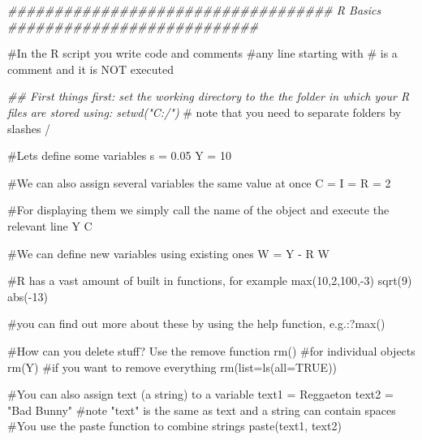 \documentclass[
  letterpaper,
  DIV=11,
  numbers=noendperiod]{scrreprt}
\newenvironment{Shaded}{\begin{snugshade}}{\end{snugshade}}
\newcommand{\AttributeTok}[1]{\textcolor[rgb]{0.40,0.45,0.13}{#1}}
\newcommand{\CommentTok}[1]{\textcolor[rgb]{0.37,0.37,0.37}{#1}}
\newcommand{\ConstantTok}[1]{\textcolor[rgb]{0.56,0.35,0.01}{#1}}
\newcommand{\DecValTok}[1]{\textcolor[rgb]{0.68,0.00,0.00}{#1}}
\newcommand{\DocumentationTok}[1]{\textcolor[rgb]{0.37,0.37,0.37}{\textit{#1}}}
\newcommand{\FloatTok}[1]{\textcolor[rgb]{0.68,0.00,0.00}{#1}}
\newcommand{\FunctionTok}[1]{\textcolor[rgb]{0.28,0.35,0.67}{#1}}
\newcommand{\NormalTok}[1]{\textcolor[rgb]{0.00,0.23,0.31}{#1}}
\newcommand{\OtherTok}[1]{\textcolor[rgb]{0.00,0.23,0.31}{#1}}
\newcommand{\SpecialCharTok}[1]{\textcolor[rgb]{0.37,0.37,0.37}{#1}}
\newcommand{\StringTok}[1]{\textcolor[rgb]{0.13,0.47,0.30}{#1}}
\begin{document}
\begin{Shaded}
\begin{Highlighting}[]
\DocumentationTok{\#\#\#\#\#\#\#\#\#\#\#\#\#\#\#\#\#\#\#\#\#\#\#\#\#\#\#\#\#\#\#\#\#\#\# R Basics \#\#\#\#\#\#\#\#\#\#\#\#\#\#\#\#\#\#\#\#\#\#\#\#\#\#\#}

\CommentTok{\#In the R script you write code and comments}
  \CommentTok{\#any line starting with \# is a comment and it is NOT executed}

\DocumentationTok{\#\# First things first: set the working directory to the the folder in which your R files are stored using: setwd("C:/")}
\CommentTok{\# note that you need to separate folders by slashes /}

\CommentTok{\#Let\textquotesingle{}s define some variables}
\NormalTok{s }\OtherTok{=} \FloatTok{0.05}
\NormalTok{Y }\OtherTok{=} \DecValTok{10}

\CommentTok{\#We can also assign several variables the same value at once}
\NormalTok{C }\OtherTok{=}\NormalTok{ I }\OtherTok{=}\NormalTok{ R }\OtherTok{=} \DecValTok{2}

\CommentTok{\#For displaying them we simply call the name of the object and execute the relevant line}
\NormalTok{Y}
\NormalTok{C}

\CommentTok{\#We can define new variables using existing ones}
\NormalTok{W }\OtherTok{=}\NormalTok{ Y }\SpecialCharTok{{-}}\NormalTok{ R}
\NormalTok{W}

\CommentTok{\#R has a vast amount of built in functions, for example}
\FunctionTok{max}\NormalTok{(}\DecValTok{10}\NormalTok{,}\DecValTok{2}\NormalTok{,}\DecValTok{100}\NormalTok{,}\SpecialCharTok{{-}}\DecValTok{3}\NormalTok{)}
\FunctionTok{sqrt}\NormalTok{(}\DecValTok{9}\NormalTok{)}
\FunctionTok{abs}\NormalTok{(}\SpecialCharTok{{-}}\DecValTok{13}\NormalTok{)}

\CommentTok{\#you can find out more about these by using the help function, e.g.:?max()}

\CommentTok{\#How can you delete stuff? Use the remove function rm()}
\CommentTok{\#for individual objects}
\FunctionTok{rm}\NormalTok{(Y)}
\CommentTok{\#if you want to remove everything}
\FunctionTok{rm}\NormalTok{(}\AttributeTok{list=}\FunctionTok{ls}\NormalTok{(}\AttributeTok{all=}\ConstantTok{TRUE}\NormalTok{))}

\CommentTok{\#You can also assign text (a string) to a variable}
\NormalTok{text1 }\OtherTok{=} \StringTok{\textquotesingle{}Reggaeton\textquotesingle{}}
\NormalTok{text2 }\OtherTok{=} \StringTok{"Bad Bunny"}
\CommentTok{\#note "text" is the same as \textquotesingle{}text\textquotesingle{} and a string can contain spaces}
\CommentTok{\#You use the paste function to combine strings}
\FunctionTok{paste}\NormalTok{(text1, text2)}


\end{Highlighting}
\end{Shaded}
\end{document}
